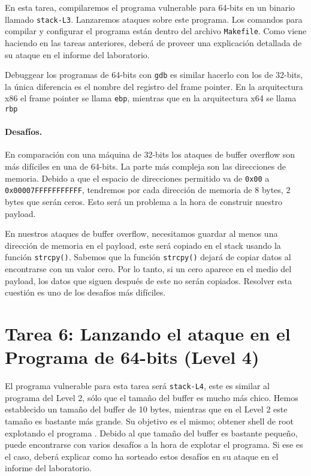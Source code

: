 En esta tarea, compilaremos el programa vulnerable para 64-bits en un binario llamado \texttt{stack-L3}. Lanzaremos ataques sobre este programa. Los comandos para compilar y configurar el programa están dentro del archivo \texttt{Makefile}. Como viene haciendo en las tareas anteriores, deberá de proveer una explicación detallada de su ataque en el informe del laboratorio.

Debuggear los programas de 64-bits con \texttt{gdb} es similar hacerlo con los de 32-bits, la única diferencia es el nombre del registro del frame pointer.
En la arquitectura x86 el frame pointer se llama \texttt{ebp}, mientras que en la arquitectura x64 se llama \texttt{rbp}


\paragraph{Desafíos.} En comparación con una máquina de 32-bits los ataques de buffer overflow son más difíciles en una de 64-bits. La parte más compleja son las direcciones de memoria. Debido a que el espacio de direcciones permitido va de \texttt{0x00} a \texttt{0x00007FFFFFFFFFFF}, tendremos por cada dirección de memoria de 8 bytes, 2 bytes que serán ceros.
Esto será un problema a la hora de construir nuestro payload.

En nuestros ataques de buffer overflow, necesitamos guardar al menos una dirección de memoria en el payload, este será copiado en el stack usando la función \texttt{strcpy()}. Sabemos que la función \texttt{strcpy()} dejará de copiar datos al encontrarse con un valor cero. Por lo tanto, si un cero
aparece en el medio del payload, los datos que siguen después de este no serán copiados. Resolver esta cuestión es uno de los desafíos más difíciles.


\section{Tarea 6: Lanzando el ataque en el Programa de 64-bits (Level 4)}

El programa vulnerable para esta tarea será \texttt{stack-L4}, este es similar al programa del Level 2, sólo que el tamaño del buffer es mucho más chico. Hemos establecido un tamaño del buffer de 10 bytes, mientras que en el Level 2 este tamaño es bastante más grande. 
Su objetivo es el mismo; obtener shell de root explotando el programa \setuid.
Debido al que tamaño del buffer es bastante pequeño, puede encontrarse con varios desafíos a la hora de explotar el programa.
Si ese es el caso, deberá explicar como ha sorteado estos desafíos en su ataque en el informe del laboratorio.



